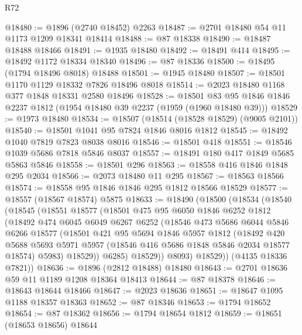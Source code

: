 \begin{lexlean}{R72}
\begin{coremodule}
@18480 := @1896 (@2740 @18452) @2263
@18487 := @2701 @18480 @54 @11 @1173 @1209 @18341 @18414
@18488 := @87 @18338
@18490 := @18487 @18488 @18466
@18491 := @1935 @18480
@18492 := @18491 @414
@18495 := @18492 @1172 @18334 @18340
@18496 := @87 @18336
@18500 := @18495 (@1794 @18496 @8018) @18488
@18501 := @1945 @18480
@18507 := @18501 @1170 @1129 @18332 @7826 @18496 @8018
@18514 := @2023 @18480 @1168 @377 @1848 @18331 @2580 @18496
@18528 := @18501 @83 @95 @1846 @1846 @2237 @1812 (@1954 @18480 @39 @2237 (@1959 (@1960 @18480 @39)))
@18529 := @1973 @18480
@18534 := @18507 (@18514 (@18528 @18529) (@9005 @2101))
@18540 := @18501 @1041 @95 @7824 @1846 @8016 @1812
@18545 := @18492 @1040 @7819 @7823 @8038 @8016
@18546 := @18501 @418
@18551 := @18546 @1039 @5686 @7818 @5846 @8037
@18557 := @18491 @180 @417 @1849 @5685 @5863 @5846
@18558 := @18501 @296
@18563 := @18558 @416 @1846 @1848 @295 @2034
@18566 := @2073 @18480 @11 @295
@18567 := @18563 @18566
@18574 := @18558 @95 @1846 @1846 @295 @1812 @18566 @18529
@18577 := @18557 (@18567 @18574) @5875
@18633 := @18490
    (@18500
      (@18534
        (@18540
          (@18545
            (@18551
              @18577
              (@18501
                @475
                @95
                @6050
                @1846
                @6252
                @1812
                (@18492
                  @474
                  @6045
                  @6049
                  @6267
                  @6252
                  (@18546
                    @473
                    @5686
                    @6044
                    @5846
                    @6266
                    @18577
                    (@18501
                      @421
                      @95
                      @5694
                      @1846
                      @5957
                      @1812
                      (@18492
                        @420
                        @5688
                        @5693
                        @5971
                        @5957
                        (@18546 @416 @5686 @1848 @5846 @2034 @18577 @18574)
                        @5983)
                      @18529))
                  @6285)
                @18529))
            @8093)
          @18529))
      (@4135 @18336 @7821))
@18636 := @1896 (@2812 @18488) @18480
@18643 := @2701 @18636 @59 @11 @1189 @1208 @18364 @18413
@18644 := @87 @18378
@18646 := @18643 @18644 @18466
@18647 := @2023 @18636
@18651 := @18647 @1095 @1188 @18357 @18363
@18652 := @87 @18346
@18653 := @1794 @18652
@18654 := @87 @18362
@18656 := @1794 @18654 @1812
@18659 := @18651 (@18653 @18656) @18644

\end{coremodule}
\end{lexlean}
